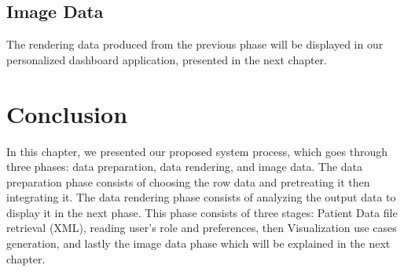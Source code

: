 \subsection{Image Data}
The rendering data produced from the previous phase will be displayed in our personalized dashboard application, presented in the next chapter.

\section{Conclusion}
In this chapter, we presented our proposed system process, which goes through three phases: data preparation, data rendering, and image data. The data preparation phase consists of choosing the row data and pretreating it then integrating it. The data rendering phase consists of analyzing the output data to display it in the next phase. This phase consists of three stages:  Patient Data file retrieval (XML), reading user’s role and preferences, then Visualization use cases generation, and lastly the image data phase which will be explained in the next chapter. 
